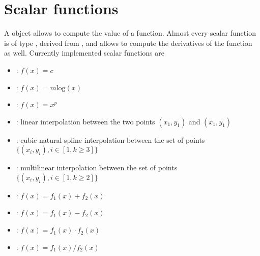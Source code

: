 %
%
%
%
%
% 
%
%

\section{Scalar functions}\label{sec:SCALARFUNCS}
A  object allows to compute the value of a function.
Almost every scalar function is of type ,
derived from , and allows to compute the derivatives of
the function as well. Currently implemented scalar functions are
\begin{itemize}
\item {}: $f(x)=c$
\item {}: $f(x)=m\textrm{log}(x)$
\item {}: $f(x)=x^p$
\item {}: linear interpolation between the two points $(x_1,y_1)$
and $(x_1,y_1)$
\item {}: cubic natural spline interpolation between the 
set of points $\{(x_i,y_i), i\in[1,k\geq3]\}$
\item {}: multilinear interpolation between the 
set of points $\{(x_i,y_i), i\in[1,k\geq2]\}$
\item {}: $f(x)=f_1(x) + f_2(x)$
\item {}: $f(x)=f_1(x) - f_2(x)$
\item {}: $f(x)=f_1(x) \cdot f_2(x)$
\item {}: $f(x)=f_1(x) / f_2(x)$
\end{itemize}

